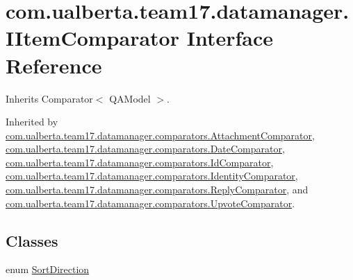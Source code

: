 \hypertarget{interfacecom_1_1ualberta_1_1team17_1_1datamanager_1_1_i_item_comparator}{\section{com.\+ualberta.\+team17.\+datamanager.\+I\+Item\+Comparator Interface Reference}
\label{interfacecom_1_1ualberta_1_1team17_1_1datamanager_1_1_i_item_comparator}
}


Inherits Comparator$<$ Q\+A\+Model $>$.



Inherited by \hyperlink{classcom_1_1ualberta_1_1team17_1_1datamanager_1_1comparators_1_1_attachment_comparator}{com.\+ualberta.\+team17.\+datamanager.\+comparators.\+Attachment\+Comparator}, \hyperlink{classcom_1_1ualberta_1_1team17_1_1datamanager_1_1comparators_1_1_date_comparator}{com.\+ualberta.\+team17.\+datamanager.\+comparators.\+Date\+Comparator}, \hyperlink{classcom_1_1ualberta_1_1team17_1_1datamanager_1_1comparators_1_1_id_comparator}{com.\+ualberta.\+team17.\+datamanager.\+comparators.\+Id\+Comparator}, \hyperlink{classcom_1_1ualberta_1_1team17_1_1datamanager_1_1comparators_1_1_identity_comparator}{com.\+ualberta.\+team17.\+datamanager.\+comparators.\+Identity\+Comparator}, \hyperlink{classcom_1_1ualberta_1_1team17_1_1datamanager_1_1comparators_1_1_reply_comparator}{com.\+ualberta.\+team17.\+datamanager.\+comparators.\+Reply\+Comparator}, and \hyperlink{classcom_1_1ualberta_1_1team17_1_1datamanager_1_1comparators_1_1_upvote_comparator}{com.\+ualberta.\+team17.\+datamanager.\+comparators.\+Upvote\+Comparator}.

\subsection*{Classes}
\begin{DoxyCompactItemize}
\item 
enum \hyperlink{enumcom_1_1ualberta_1_1team17_1_1datamanager_1_1_i_item_comparator_1_1_sort_direction}{Sort\+Direction}
\end{DoxyCompactItemize}
